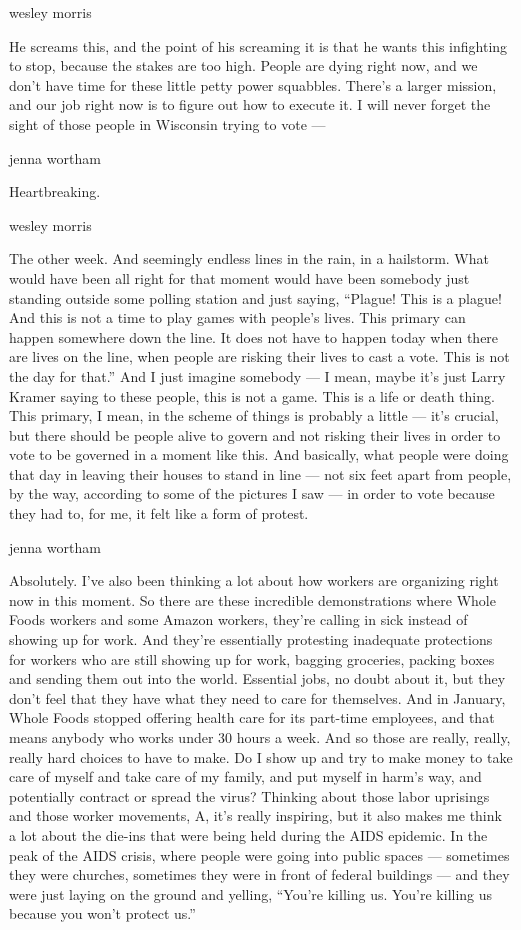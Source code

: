 wesley morris

He screams this, and the point of his screaming it is that he wants this
infighting to stop, because the stakes are too high. People are dying
right now, and we don't have time for these little petty power
squabbles. There's a larger mission, and our job right now is to figure
out how to execute it. I will never forget the sight of those people in
Wisconsin trying to vote ---

jenna wortham

Heartbreaking.

wesley morris

The other week. And seemingly endless lines in the rain, in a hailstorm.
What would have been all right for that moment would have been somebody
just standing outside some polling station and just saying, ``Plague!
This is a plague! And this is not a time to play games with people's
lives. This primary can happen somewhere down the line. It does not have
to happen today when there are lives on the line, when people are
risking their lives to cast a vote. This is not the day for that.'' And
I just imagine somebody --- I mean, maybe it's just Larry Kramer saying
to these people, this is not a game. This is a life or death thing. This
primary, I mean, in the scheme of things is probably a little --- it's
crucial, but there should be people alive to govern and not risking
their lives in order to vote to be governed in a moment like this. And
basically, what people were doing that day in leaving their houses to
stand in line --- not six feet apart from people, by the way, according
to some of the pictures I saw --- in order to vote because they had to,
for me, it felt like a form of protest.

jenna wortham

Absolutely. I've also been thinking a lot about how workers are
organizing right now in this moment. So there are these incredible
demonstrations where Whole Foods workers and some Amazon workers,
they're calling in sick instead of showing up for work. And they're
essentially protesting inadequate protections for workers who are still
showing up for work, bagging groceries, packing boxes and sending them
out into the world. Essential jobs, no doubt about it, but they don't
feel that they have what they need to care for themselves. And in
January, Whole Foods stopped offering health care for its part-time
employees, and that means anybody who works under 30 hours a week. And
so those are really, really, really hard choices to have to make. Do I
show up and try to make money to take care of myself and take care of my
family, and put myself in harm's way, and potentially contract or spread
the virus? Thinking about those labor uprisings and those worker
movements, A, it's really inspiring, but it also makes me think a lot
about the die-ins that were being held during the AIDS epidemic. In the
peak of the AIDS crisis, where people were going into public spaces ---
sometimes they were churches, sometimes they were in front of federal
buildings --- and they were just laying on the ground and yelling,
``You're killing us. You're killing us because you won't protect us.''

